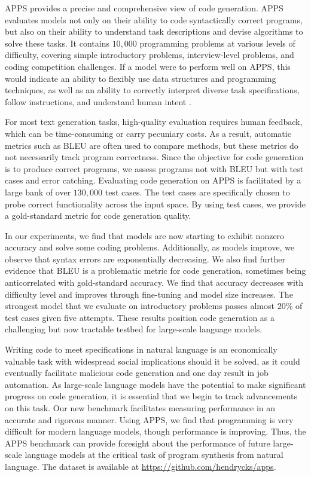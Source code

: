 APPS provides a precise and comprehensive view of code generation. APPS evaluates models not only on their ability to code syntactically correct programs, but also on their ability to understand task descriptions and devise algorithms to solve these tasks. It contains $10,\!000$ programming problems at various levels of difficulty, covering simple introductory problems, interview-level problems, and coding competition challenges. If a model were to perform well on APPS, this would indicate an ability to flexibly use data structures and programming techniques, as well as an ability to correctly interpret diverse task specifications, follow instructions, and understand human intent \citep{hendrycks2021ethics}.

For most text generation tasks, high-quality evaluation requires human feedback, which can be time-consuming or carry pecuniary costs. As a result, automatic metrics such as BLEU \citep{papineni2002bleu} are often used to compare methods, but these metrics do not necessarily track program correctness. Since the objective for code generation is to produce correct programs, we assess programs not with BLEU but with test cases and error catching. Evaluating code generation on APPS is facilitated by a large bank of over $130,\!000$ test cases. The test cases are specifically chosen to probe correct functionality across the input space. By using test cases, we provide a gold-standard metric for code generation quality.

In our experiments, we find that models are now starting to exhibit nonzero accuracy and solve some coding problems. Additionally, as models improve, we observe that syntax errors are exponentially decreasing. We also find further evidence that BLEU is a problematic metric for code generation, sometimes being anticorrelated with gold-standard accuracy. We find that accuracy decreases with difficulty level and improves through fine-tuning and model size increases. The strongest model that we evaluate on introductory problems passes almost $20\%$ of test cases given five attempts. These results position code generation as a challenging but now tractable testbed for large-scale language models.

Writing code to meet specifications in natural language is an economically valuable task with widespread social implications should it be solved, as it could eventually facilitate malicious code generation and one day result in job automation. As large-scale language models have the potential to make significant progress on code generation, it is essential that we begin to track advancements on this task. Our new benchmark facilitates measuring performance in an accurate and rigorous manner. Using APPS, we find that programming is very difficult for modern language models, though performance is improving. Thus, the APPS benchmark can provide foresight about the performance of future large-scale language models at the critical task of program synthesis from natural language. The dataset is available at \href{https://github.com/hendrycks/apps}{https://github.com/hendrycks/apps}.







